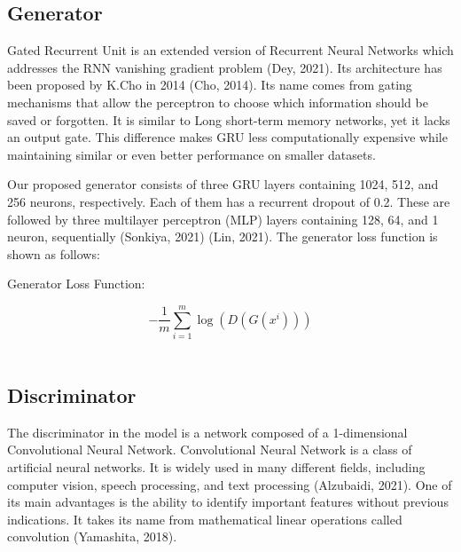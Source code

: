 \documentclass[11pt]{article} %
\begin{document}
\subsection{Generator}

Gated Recurrent Unit is an extended version of Recurrent Neural Networks which addresses the RNN vanishing gradient problem (Dey, 2021).
Its architecture has been proposed by K.Cho in 2014 (Cho, 2014). Its name comes from gating mechanisms that allow the perceptron to choose which information should be saved or forgotten. It is similar to  Long short-term memory networks, yet it lacks an output gate. This difference makes GRU less computationally expensive while maintaining similar or even better performance on smaller datasets. 

Our proposed generator consists of three GRU layers containing 1024, 512, and 256 neurons, respectively. Each of them has a recurrent dropout of 0.2. These are followed by three multilayer perceptron (MLP) layers containing 128, 64, and 1 neuron, sequentially (Sonkiya, 2021) (Lin, 2021). 
The generator loss function is shown as follows: 

\begin{center}   Generator Loss Function:  \end{center}
\begin{equation}
-\frac{1}{m} \sum_{i=1}^{m} \log \left(D\left(G\left(x^{i}\right)\right)\right)
\end{equation}\\

\subsection{Discriminator}

The discriminator in the model is a network composed of a 1-dimensional Convolutional Neural Network. 
Convolutional Neural Network is a class of artificial neural networks. It is widely used in many different fields, including computer vision, speech processing, and text processing (Alzubaidi, 2021). One of its main advantages is the ability to identify important features without previous indications. It takes its name from mathematical linear operations called convolution (Yamashita, 2018).
\end{document}
